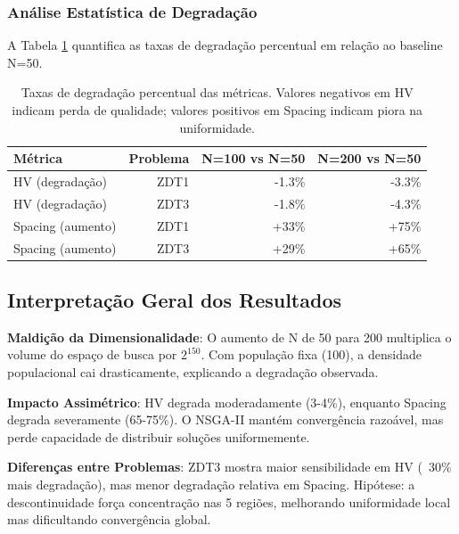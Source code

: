 \subsubsection{Análise Estatística de Degradação}
A Tabela \ref{tab:degradation} quantifica as taxas de degradação percentual em relação ao baseline N=50.

\begin{table}[h]
\centering
\begin{tabular}{lrrr}
\toprule
\textbf{Métrica} & \textbf{Problema} & \textbf{N=100 vs N=50} & \textbf{N=200 vs N=50} \\
\midrule
HV (degradação) & ZDT1 & -1.3\% & -3.3\% \\
HV (degradação) & ZDT3 & -1.8\% & -4.3\% \\
\midrule
Spacing (aumento) & ZDT1 & +33\% & +75\% \\
Spacing (aumento) & ZDT3 & +29\% & +65\% \\
\bottomrule
\end{tabular}
\caption{Taxas de degradação percentual das métricas. Valores negativos em HV indicam perda de qualidade; valores positivos em Spacing indicam piora na uniformidade.}
\label{tab:degradation}
\end{table}

\subsection{Interpretação Geral dos Resultados}

\textbf{Maldição da Dimensionalidade}: O aumento de N de 50 para 200 multiplica o volume do espaço de busca por $2^{150}$. Com população fixa (100), a densidade populacional cai drasticamente, explicando a degradação observada.

\textbf{Impacto Assimétrico}: HV degrada moderadamente (3-4\%), enquanto Spacing degrada severamente (65-75\%). O NSGA-II mantém convergência razoável, mas perde capacidade de distribuir soluções uniformemente.

\textbf{Diferenças entre Problemas}: ZDT3 mostra maior sensibilidade em HV (~30\% mais degradação), mas menor degradação relativa em Spacing. Hipótese: a descontinuidade força concentração nas 5 regiões, melhorando uniformidade local mas dificultando convergência global.